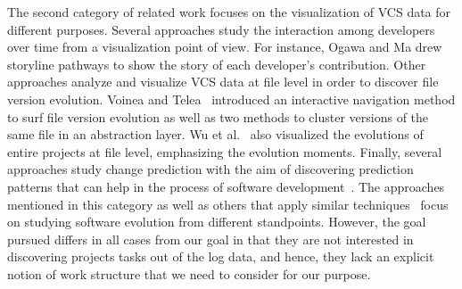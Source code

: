 The second category of related work focuses on the visualization of VCS data %
for different purposes.
Several approaches study the interaction among developers over time from a visualization point of view. For instance, Ogawa and Ma \citep{ogawa2010software} drew storyline pathways to show the story of each developer's contribution. Other approaches analyze and visualize VCS data at file level in order to discover file version evolution. Voinea and Telea~\citep{voinea_multiscale_2006} introduced an interactive navigation method to surf file version evolution as well as two methods to cluster versions of the same file in an abstraction layer. Wu et al.~\citep{jingwei_evolution_2004} also visualized the evolutions of entire projects at file level, emphasizing the evolution moments.
Finally, several approaches study change prediction with the aim of discovering prediction patterns that can help in the process of software development~\citep{zimmermann_mining_2004,ying_predicting_2004}.
The approaches mentioned in this category as well as others that apply similar techniques~\citep{feldt2013supporting,kagdi_mining_2006,dambros_flexible_2008} focus on studying software evolution from different standpoints. However, the goal pursued differs in all cases from our goal in that they are not interested in discovering projects tasks out of the log data, and hence, they lack an explicit notion of work structure that we need to consider for our purpose.

